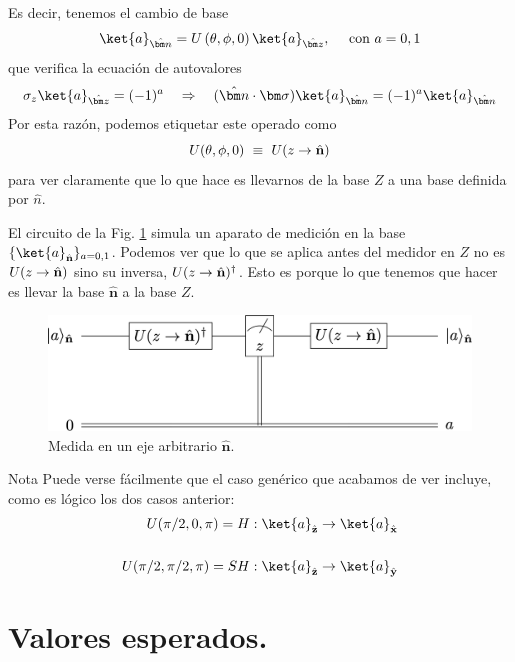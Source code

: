 \documentclass[a4paper,11pt]{book} %
\numberwithin{equation}{chapter}
\def\lp{\left(}
\def\rp{\right)}
\def\rqa{\quad \Rightarrow \quad}
\begin{document}
Es decir, tenemos el cambio de base
	\begin{equation}
	\ket{a}_{\hat{\bm n}} = U \lp \theta, \phi, 0 \rp \ket{a}_{\hat{\bm z}}, ~~~~ \text{con } a= 0,1 
	\end{equation}
que verifica la ecuación de autovalores
	\begin{equation}
	\sigma_z \ket{a}_{\hat{\bm z}} = (-1)^a \rqa (\hat{\bm n} \cdot \bm \sigma ) \ket{a}_{\hat{\bm n}} = (-1)^a \ket{a}_{\hat{\bm n}}
	\end{equation}
Por esta razón, podemos etiquetar este operado como
	\begin{equation}
	U(\theta,\phi,0) ~ \equiv ~ U(z\to \hat{\bf n})
	\end{equation}
para ver claramente que lo que hace es llevarnos de la base $Z$ a una base definida por $\hat{n}$.

El circuito de la Fig. \ref{Fig_medidas2_nbasis_measure2}  simula un aparato de medición en la base $\{\ket{a}_{\hat{\bf n}}\}_{a=0,1}$. Podemos ver que lo que se aplica antes del medidor en $Z$ no es $U(z\to \hat{\bf n})$ sino su inversa, $U(z\to \hat{\bf n})^\dagger$. Esto es porque lo que tenemos que hacer es llevar la base $\hat{\bm n}$ a la base $Z$.

	\begin{figure}[H]
	\centering 
	\includegraphics[width=0.7\linewidth]{Figuras/Fig_medidas2_nbasis_measure2}
	\caption{Medida en un eje arbitrario $\hat{ \bm n}$.}
	\label{Fig_medidas2_nbasis_measure2}
	\end{figure}

	\begin{mybox_blue}{Nota}
	Puede verse fácilmente que el caso genérico que acabamos de ver incluye, como es lógico
	los dos casos anterior:
	\begin{eqnarray}
 	U(\pi/2,0,\pi)=H : \ket{a}_{\hat{\bf z}} \to \ket{a}_{\hat{\bf x}} \\ \rule{0mm}{8mm}
 	U(\pi/2,\pi/2,\pi)= SH  : \ket{a}_{\hat{\bf z}} \to \ket{a}_{\hat{\bf y}}
	\end{eqnarray}
	\end{mybox_blue}
     
    


    \section{Valores esperados.}
    
\end{document}
